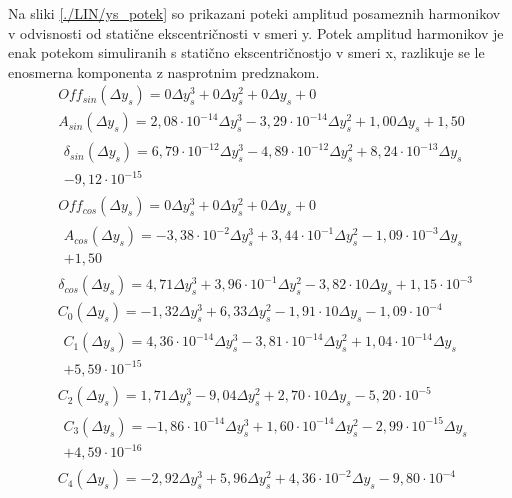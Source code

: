 Na sliki \ref{./LIN/ys_potek} so prikazani poteki amplitud posameznih harmonikov v odvisnosti od statične ekscentričnosti v smeri y.  Potek amplitud harmonikov je enak potekom simuliranih s statično ekscentričnostjo v smeri x, razlikuje se le enosmerna komponenta z nasprotnim predznakom.
\begin{eqnarray}
\label{analog_lin_ys}
&Off_{sin}(\Delta y_s) = 0\Delta y_s^{3}+0\Delta y_s^{2}+0\Delta y_s+0 \\
&A_{sin}(\Delta y_s) =2,08\cdot 10^{-14}\Delta y_s^{3}-3,29\cdot 10^{-14}\Delta y_s^{2}+1,00\Delta y_s+1,50 \\                           
& \begin{split}\delta_{sin}(\Delta y_s) =6,79\cdot 10^{-12}\Delta y_s^{3}-4,89\cdot 10^{-12}\Delta y_s^{2}+8,24\cdot 10^{-13}\Delta y_s\\-9,12\cdot 10^{-15}\end{split} \\ 
&Off_{cos}(\Delta y_s) = 0\Delta y_s^{3}+0\Delta y_s^{2}+0\Delta y_s+0 \\
&\begin{split}A_{cos}(\Delta y_s) =-3,38\cdot 10^{-2}\Delta y_s^{3}+3,44\cdot 10^{-1}\Delta y_s^{2}-1,09\cdot 10^{-3}\Delta y_s\\+1,50 \end{split}\\               
&\delta_{cos}(\Delta y_s) =4,71\Delta y_s^{3}+3,96\cdot 10^{-1}\Delta y_s^{2}-3,82\cdot 10\Delta y_s+1,15\cdot 10^{-3}
\end{eqnarray}
\begin{eqnarray}
\label{nap_lin_ys}
&C_0(\Delta y_s) =-1,32\Delta y_s^{3}+6,33\Delta y_s^{2}-1,91\cdot 10\Delta y_s-1,09\cdot 10^{-4} \\                                   
&\begin{split}C_1(\Delta y_s) =4,36\cdot 10^{-14}\Delta y_s^{3}-3,81\cdot 10^{-14}\Delta y_s^{2}+1,04\cdot 10^{-14}\Delta y_s\\+5,59\cdot 10^{-15} \end{split}\\ 
&C_2(\Delta y_s) =1,71\Delta y_s^{3}-9,04\Delta y_s^{2}+2,70\cdot 10\Delta y_s-5,20\cdot 10^{-5} \\                                    
&\begin{split}C_3(\Delta y_s) =-1,86\cdot 10^{-14}\Delta y_s^{3}+1,60\cdot 10^{-14}\Delta y_s^{2}-2,99\cdot 10^{-15}\Delta y_s\\+4,59\cdot 10^{-16}\end{split} \\
&C_4(\Delta y_s) =-2,92\Delta y_s^{3}+5,96\Delta y_s^{2}+4,36\cdot 10^{-2}\Delta y_s-9,80\cdot 10^{-4} 
\end{eqnarray}
